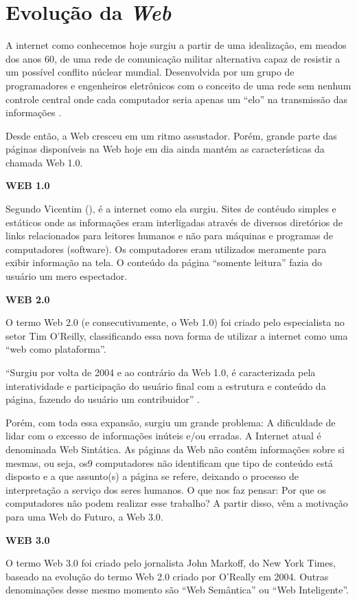 \section{Evolução da \textit{Web}}
A internet como conhecemos hoje surgiu a partir de uma idealização, em meados dos
anos 60, de uma rede de comunicação militar alternativa capaz de resistir a um possível
conflito núclear mundial. Desenvolvida por um grupo de programadores e engenheiros
eletrônicos com o conceito de uma rede sem nenhum controle central onde cada
computador seria apenas um “elo” na transmissão das informações \cite{monteiro01}.

Desde então, a Web cresceu em um ritmo assustador. Porém, grande parte das páginas
disponíveis na Web hoje em dia ainda mantém as características da chamada Web 1.0.

\textbf{WEB 1.0}

Segundo Vicentim (\citeyear{vicentim13}), é a internet como ela surgiu. Sites de contéudo simples e
estáticos onde as informações eram interligadas através de diversos diretórios de links
relacionados para leitores humanos e não para máquinas e programas de computadores
(software). Os computadores eram utilizados meramente para exibir informação na tela. O
conteúdo da página “somente leitura” fazia do usuário um mero espectador.

\textbf{WEB 2.0}

O termo Web 2.0 (e consecutivamente, o Web 1.0) foi criado pelo especialista no setor
Tim O’Reilly, classificando essa nova forma de utilizar a internet como uma “web como
plataforma”.

“Surgiu por volta de 2004 e ao contrário da Web 1.0, é caracterizada pela interatividade e
participação do usuário final com a estrutura e conteúdo da página, fazendo do usuário um
contribuidor” \cite{lacerda12}.

Porém, com toda essa expansão, surgiu um grande problema: A dificuldade de lidar
com o excesso de informações inúteis e/ou erradas. A Internet atual é denominada Web
Sintática. As páginas da Web não contêm informações sobre si mesmas, ou seja, os9
computadores não identificam que tipo de conteúdo está disposto e a que assunto(s) a
página se refere, deixando o processo de interpretação a serviço dos seres humanos. O que
nos faz pensar: Por que os computadores não podem realizar esse trabalho?
A partir disso, vêm a motivação para uma Web do Futuro, a Web 3.0.

\textbf{WEB 3.0}

O termo Web 3.0 foi criado pelo jornalista John Markoff, do New York Times, baseado
na evolução do termo Web 2.0 criado por O’Really em 2004. Outras denominações desse
mesmo momento são “Web Semântica” ou “Web Inteligente”.

